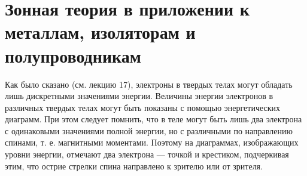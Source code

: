 \documentclass[a4paper,10pt]{book}
\begin{document}
\section{Зонная теория в приложении к металлам, изоляторам и полупроводникам}

Как было сказано (см. лекцию 17), электроны в твердых телах могут обладать лишь дискретными значениями энергии. Величины энергии электронов в различных твердых телах могут быть показаны с помощью энергетических диаграмм. При этом следует помнить, что в теле могут быть лишь два электрона с одинаковыми значениями полной энергии, но с различными по направлению спинами, т. е. магнитными моментами. Поэтому на диаграммах, изображающих уровни энергии, отмечают два электрона — точкой и крестиком, подчеркивая этим, что острие стрелки спина направлено к зрителю или от зрителя.

\begin{figure}[h]
	\caption{}
	\label{pic53}
\end{figure}
\begin{figure}[h]
	\caption{}
	\label{pic54}
\end{figure}
\end{document}
